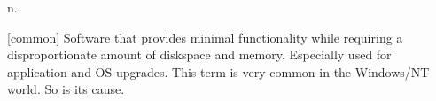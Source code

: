  n.

[common] Software that provides minimal functionality while requiring a
disproportionate amount of diskspace and memory. Especially used for application
and OS upgrades. This term is very common in the Windows/NT world. So is its
cause.

